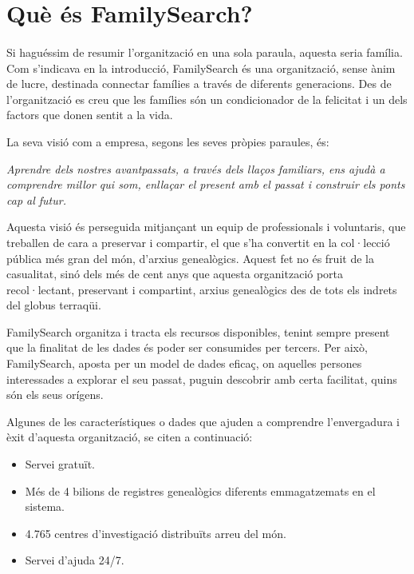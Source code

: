 \section{Què és FamilySearch?}

    \paragraph{}
    Si haguéssim de resumir l’organització en una sola paraula, aquesta seria família. Com s’indicava en la introducció, FamilySearch és una organització, sense ànim de lucre, destinada connectar famílies a través de diferents generacions. Des de l’organització es creu que les famílies són un condicionador de la felicitat i un dels factors que donen sentit a la vida.

    La seva visió com a empresa, segons les seves pròpies paraules, és:

    \begin{displayquote}
        \emph{Aprendre dels nostres avantpassats, a través dels llaços familiars, ens ajudà a comprendre millor qui som, enllaçar el present amb el passat i construir els ponts cap al futur.}
    \end{displayquote}

    Aquesta visió és perseguida mitjançant un equip de professionals i voluntaris, que treballen de cara a preservar i compartir, el que s'ha convertit en la col·lecció pública més gran del món, d'arxius genealògics. Aquest fet no és fruit de la casualitat, sinó dels més de cent anys que aquesta organització porta recol·lectant, preservant i compartint, arxius genealògics des de tots els indrets del globus terraqüi.

    FamilySearch organitza i tracta els recursos disponibles, tenint sempre present que la finalitat de les dades és poder ser consumides per tercers. Per això, Family\-Search, aposta per un model de dades eficaç, on aquelles persones interessades a explorar el seu passat, puguin descobrir amb certa facilitat, quins són els seus orígens.

    Algunes de les característiques o dades que ajuden a comprendre l'envergadura i èxit d’aquesta organització, se citen a continuació:

    \begin{itemize}
        \item Servei gratuït.
        \item Més de 4 bilions de registres genealògics diferents emmagatzemats en el sistema.
        \item 4.765 centres d’investigació distribuïts arreu del món.
        \item Servei d'ajuda 24/7.
    \end{itemize}
